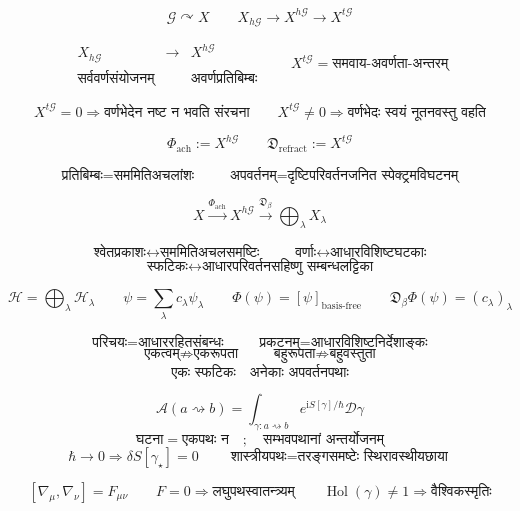 \documentclass{article}
\begin{document}
\[\mathcal G\curvearrowright X\qquad
X_{h\mathcal G}\longrightarrow X^{h\mathcal G}\longrightarrow X^{t\mathcal G}\]

\[\boxed{\begin{array}{ccc}X_{h\mathcal G}&\to&X^{h\mathcal G}\\
\text{सर्ववर्णसंयोजनम्}&&\text{अवर्णप्रतिबिम्बः}\end{array}}
\qquad\boxed{X^{t\mathcal G}=\text{समवाय-अवर्णता-अन्तरम्}}\]

\[\boxed{X^{t\mathcal G}=0\Longrightarrow
\text{वर्णभेदेन नष्ट न भवति संरचना}}\qquad
X^{t\mathcal G}\neq0\Longrightarrow
\boxed{\text{वर्णभेदः स्वयं नूतनवस्तु वहति}}\]

\[\boxed{\Phi_{\mathrm{ach}}:=X^{h\mathcal G}}\qquad
\boxed{\mathfrak D_{\mathrm{refract}}:=X^{t\mathcal G}}\]

\[\boxed{\text{प्रतिबिम्बः}=\text{सममितिअचलांशः}}\qquad
\boxed{\text{अपवर्तनम्}=\text{दृष्टिपरिवर्तनजनित स्पेक्ट्रमविघटनम्}}\]

\[X\xrightarrow{\Phi_{\mathrm{ach}}}X^{h\mathcal G}
\xrightarrow{\mathfrak D_\beta}\bigoplus_{\lambda}X_\lambda\]

\[\boxed{\text{श्वेतप्रकाशः}\longleftrightarrow\text{सममितिअचलसमष्टिः}}\qquad
\boxed{\text{वर्णाः}\longleftrightarrow\text{आधारविशिष्टघटकाः}}\]
\[\boxed{\text{स्फटिकः}\longleftrightarrow
\text{आधारपरिवर्तनसहिष्णु सम्बन्धलट्टिका}}\]

\[\mathcal H=\bigoplus_{\lambda}\mathcal H_\lambda\qquad
\psi=\sum_{\lambda}c_\lambda\psi_\lambda\qquad
\boxed{\Phi(\psi)=[\psi]_{\text{basis-free}}}\qquad
\boxed{\mathfrak D_\beta\Phi(\psi)=(c_\lambda)_\lambda}\]

\[\boxed{\text{परिचयः}=\text{आधाररहितसंबन्धः}}\qquad
\boxed{\text{प्रकटनम्}=\text{आधारविशिष्टनिर्देशाङ्कः}}\]
\[\boxed{\text{एकत्वम्}\not\Rightarrow\text{एकरूपता}}\qquad
\boxed{\text{बहुरूपता}\not\Rightarrow\text{बहुवस्तुता}}\]
\[\boxed{\text{एकः स्फटिकः}\quad\text{अनेकाः अपवर्तनपथाः}}\]

\[\mathcal A(a\rightsquigarrow b)=\int_{\gamma:a\rightsquigarrow b}
e^{\mathrm iS[\gamma]/\hbar}\mathcal D\gamma\]
\[\boxed{\text{घटना}=\text{एकपथः न}\quad;\quad
\text{सम्भवपथानां अन्तर्योजनम्}}\]
\[\hbar\to0\Longrightarrow\delta S[\gamma_\star]=0\qquad
\boxed{\text{शास्त्रीयपथः}=\text{तरङ्गसमष्टेः स्थिरावस्थीयछाया}}\]

\[[\nabla_\mu,\nabla_\nu]=F_{\mu\nu}\qquad
F=0\Longrightarrow\text{लघुपथस्वातन्त्र्यम्}\qquad
\operatorname{Hol}(\gamma)\neq1\Longrightarrow\text{वैश्विकस्मृतिः}\]
\end{document}

